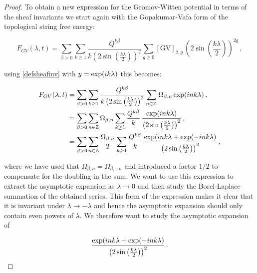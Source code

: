 \documentclass[a4paper,12pt,justification=centering]{article}
\numberwithin{equation}{section}
\newcommand{\ii}{\textnormal{i}}
\theoremstyle{plain}%
\theoremstyle{definition}
\begin{document}
\begin{proof}
To obtain a new expression for the Gromov-Witten potential in terms of the sheaf invariants we start again with the Gopakumar-Vafa form of the topological string free energy:

\begin{equation}
F_{GV}(\lambda,t)= \sum_{\beta>0} \sum_{k\ge 1}  \frac{Q^{k\beta}}{k \left( 2 \sin \left( \frac{k\lambda}{2}\right)\right)^{2}}  \sum_{g\ge 0} [\textrm{GV}]_{\beta,g}\, \left( 2 \sin \left( \frac{k\lambda}{2}\right)\right)^{2g} \,,
\end{equation}

using \eqref{defsheafinv} with $y=\exp(\ii k\lambda)$ this becomes:

\begin{align}
F_{GV}(\lambda,t) &= \sum_{\beta>0} \sum_{k\ge 1}  \frac{Q^{k\beta}}{k \left( 2 \sin \left( \frac{k\lambda}{2}\right)\right)^{2}} \sum_{n\in \mathbb{Z}\,} \Omega_{\beta,n} \exp(\ii  n k\lambda) \,,\\
&= \sum_{\beta>0} \sum_{n\in\mathbb{Z}}  \Omega_{\beta,n}   \sum_{k\ge 1}   \frac{Q^{k\beta}}{k}  \,  \frac{ \exp(\ii  n k\lambda)}{{\left( 2 \sin \left( \frac{k\lambda}{2}\right)\right)^{2}}} \,,\\
&=  \sum_{\beta>0} \sum_{n\in \mathbb{Z}} \frac{ \Omega_{\beta,n}}{2}   \sum_{k\ge 1}   \frac{Q^{k\beta}}{k}  \,  \frac{ \exp(\ii  n k\lambda+ \exp(-\ii  n k\lambda)}{{\left( 2 \sin \left( \frac{k\lambda}{2}\right)\right)^{2}}} \,,
\end{align}

where we have used that $\Omega_{\beta,n}=\Omega_{\beta,-n}$ and introduced a factor $1/2$ to compensate for the doubling in the sum. We want to use this expression to extract the asymptotic expansion as $\lambda\rightarrow 0$ and then study the Borel-Laplace summation of the obtained series. This form of the expression makes it clear that it is invariant under $\lambda\rightarrow -\lambda$ and hence the asymptotic expansion should only contain even powers of $\lambda$. We therefore want to study  the asymptotic expansion of 

$$\frac{ \exp(\ii  n k\lambda+ \exp(-\ii  n k\lambda)}{{\left( 2 \sin \left( \frac{k\lambda}{2}\right)\right)^{2}}}\,.$$



\end{proof}
\end{document}
